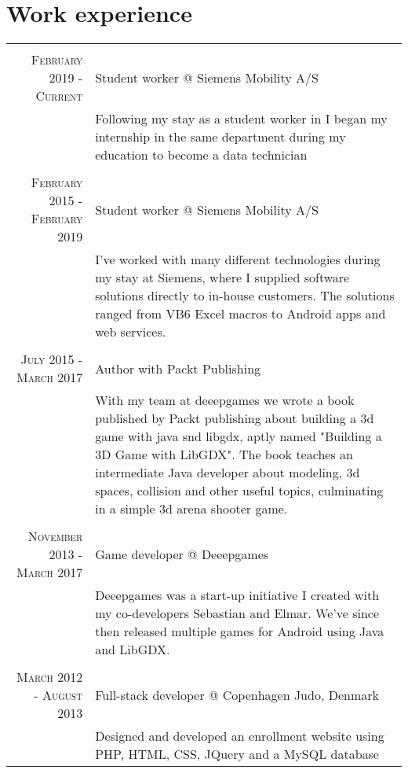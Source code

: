 \documentclass[a4paper,10pt]{article}
\begin{document}
\section{Work experience}
\begin{tabular}{r|p{11cm}}
    \multicolumn{2}{c}{} \\
    \textsc{February 2019 - Current} & Student worker @ Siemens Mobility A/S\\&\footnotesize{Following my stay as a student worker in I began my internship in the same department during my education to become a data technician}\\
    
    \multicolumn{2}{c}{} \\
    \textsc{February 2015 - February 2019} & Student worker @ Siemens Mobility A/S\\&\footnotesize{I’ve worked with many different technologies during my stay at Siemens, where I supplied software solutions directly to in-house customers. The solutions ranged from VB6 Excel macros to Android apps and web services.}\\
    
    \multicolumn{2}{c}{} \\
    \textsc{July 2015 - March 2017} & Author with Packt Publishing\\&\footnotesize{With my team at deeepgames we wrote a book published by Packt publishing about building a 3d game with java snd libgdx, aptly named "Building a 3D Game with LibGDX". The book teaches an intermediate Java developer about modeling, 3d spaces, collision and other useful topics, culminating in a simple 3d arena shooter game.}\\

    \multicolumn{2}{c}{} \\
    \textsc{November 2013 - March 2017} & Game developer @ Deeepgames\\&\footnotesize{Deeepgames was a start-up initiative I created with my co-developers Sebastian and Elmar. We've since then released multiple games for Android using Java and LibGDX.}\\

    \multicolumn{2}{c}{} \\
    \textsc{March 2012 - August 2013} & Full-stack developer @ Copenhagen Judo, Denmark \\&\footnotesize{Designed and developed an enrollment website using PHP, HTML, CSS, JQuery and a MySQL database}\\
    
\end{tabular}
\end{document}
